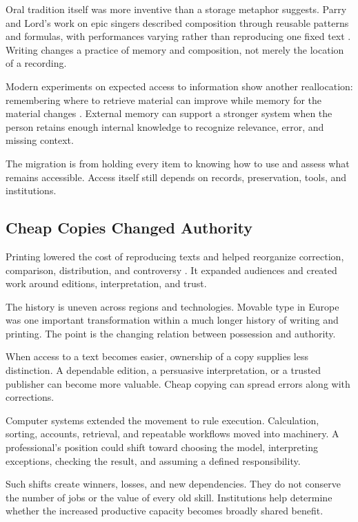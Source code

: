 \documentclass[11pt,openany]{book}
\begin{document}
Oral tradition itself was more inventive than a storage metaphor suggests. Parry and Lord's work on epic singers described composition through reusable patterns and formulas, with performances varying rather than reproducing one fixed text \cite{parry1971making,parry1960singer}. Writing changes a practice of memory and composition, not merely the location of a recording.

Modern experiments on expected access to information show another reallocation: remembering where to retrieve material can improve while memory for the material changes \cite{sparrow2011google}. External memory can support a stronger system when the person retains enough internal knowledge to recognize relevance, error, and missing context.

The migration is from holding every item to knowing how to use and assess what remains accessible. Access itself still depends on records, preservation, tools, and institutions.

\subsection{Cheap Copies Changed Authority}

Printing lowered the cost of reproducing texts and helped reorganize correction, comparison, distribution, and controversy \cite{eisenstein1979printing}. It expanded audiences and created work around editions, interpretation, and trust.

The history is uneven across regions and technologies. Movable type in Europe was one important transformation within a much longer history of writing and printing. The point is the changing relation between possession and authority.

When access to a text becomes easier, ownership of a copy supplies less distinction. A dependable edition, a persuasive interpretation, or a trusted publisher can become more valuable. Cheap copying can spread errors along with corrections.

Computer systems extended the movement to rule execution. Calculation, sorting, accounts, retrieval, and repeatable workflows moved into machinery. A professional's position could shift toward choosing the model, interpreting exceptions, checking the result, and assuming a defined responsibility.

Such shifts create winners, losses, and new dependencies. They do not conserve the number of jobs or the value of every old skill. Institutions help determine whether the increased productive capacity becomes broadly shared benefit.
\end{document}
